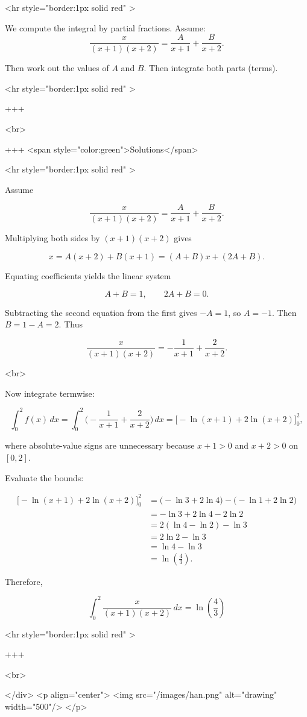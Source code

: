 <hr style="border:1px solid red" >

 We compute the integral by partial fractions. Assume:
 $$
\frac{x}{(x+1)(x+2)}=\frac{A}{x+1}+\frac{B}{x+2}.
$$

Then work out the values of $A$ and $B$. Then integrate both parts (terms).

<hr style="border:1px solid red" >

+++

<br>

+++ <span style="color:green">Solutions</span>

<hr style="border:1px solid red" >

Assume

$$
\frac{x}{(x+1)(x+2)}=\frac{A}{x+1}+\frac{B}{x+2}.
$$

Multiplying both sides by $(x+1)(x+2)$ gives

$$
x = A(x+2)+B(x+1) = (A+B)x + (2A+B).
$$

Equating coefficients yields the linear system

$$
A+B=1,\qquad 2A+B=0.
$$

Subtracting the second equation from the first gives $-A=1$, so $A=-1$. Then $B=1-A=2$. Thus

$$
\frac{x}{(x+1)(x+2)} = -\frac{1}{x+1}+\frac{2}{x+2}.
$$

<br>

Now integrate termwise:

$$
\int_{0}^{2} f(x)\,dx
= \int_{0}^{2}\Big(-\frac{1}{x+1}+\frac{2}{x+2}\Big)\,dx
= \Big[-\ln(x+1)+2\ln(x+2)\Big]_{0}^{2},
$$

where absolute-value signs are unnecessary because $x+1>0$ and $x+2>0$ on $[0,2]$.

Evaluate the bounds:

$$
\begin{aligned}
\Big[-\ln(x+1)+2\ln(x+2)\Big]_{0}^{2}
&= \big(-\ln 3 + 2\ln 4\big) - \big(-\ln 1 + 2\ln 2\big) \\
&= -\ln 3 + 2\ln 4 - 2\ln 2 \\
&= 2(\ln 4-\ln 2)-\ln 3 \\
&= 2\ln 2 - \ln 3 \\
&= \ln 4 - \ln 3 \\
&= \ln\!\left(\frac{4}{3}\right).
\end{aligned}
$$


Therefore,

$$
\displaystyle \int_{0}^{2} \frac{x}{(x+1)(x+2)}\,dx = \ln\!\left(\frac{4}{3}\right)
$$

<hr style="border:1px solid red" >

+++

<br>

</div>
<p align="center">
<img src="/images/han.png" alt="drawing" width="500"/>
</p>

